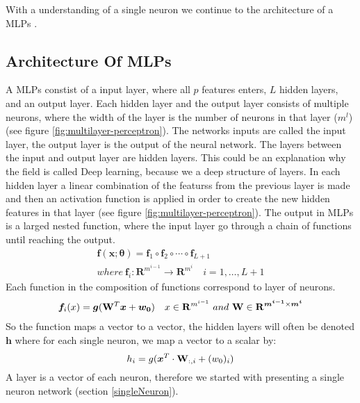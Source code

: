 With a understanding of a single neuron we continue to the architecture of a MLPs \parencite{Goodfellow-et-al-2016} \parencite{Mackay18}.


\subsection{Architecture Of MLPs}
A MLPs constist of a input layer, where all $p$ features enters, $L$ hidden layers, and an output layer. Each hidden layer and the output layer consists of multiple neurons, where the width of the layer is the number of neurons in that layer ($m^l$) (see figure \ref{fig:multilayer-perceptron}). The networks inputs are called the input layer, the output layer is the output of the neural network. The layers between the input and output layer are hidden layers. This could be an explanation why the field is called Deep learning, because we a deep structure of layers. In each hidden layer a linear combination of the featurss from the previous layer is made and then an activation function is applied in order to create the new hidden features in that layer (see figure \ref{fig:multilayer-perceptron}). The output in MLPs is a larged nested function, where the input layer go through a chain of functions until reaching the output.
\begin{align}
\bm{f}(\bm{x};\bm{\theta})=\bm{f}_1 \circ \bm{f}_2 \circ \cdots \circ \bm{f}_{L+1}\\
where \ \bm{f}_i : \mathbf{R}^{m^{i-1}} \to \mathbf{R}^{m^{i}} \quad i=1,\ldots, L+1
\end{align}
Each function in the composition of functions correspond to layer of neurons.
\begin{align}
\bm{f}_i(x)=\bm{g}(\mathbf{W}^T \bm{x} + \bm{w_0}) \quad x\in \mathbf{R}^{m^{i-1}} \ and \ \mathbf{W} \in \mathbf{R}^{\bm{m^{i-1}} \times \bm{m^{i}} }
\end{align}
So the function maps a vector to a vector, the hidden layers will often be denoted $\bm{h}$ where for each single neuron, we map a vector to a scalar by:
$$h_i=g(\bm{x}^T \cdot \mathbf{W}_{:,i} + (w_0)_{i})$$
A layer is a vector of each neuron, therefore we started with presenting a single neuron network (section \ref{singleNeuron}).

